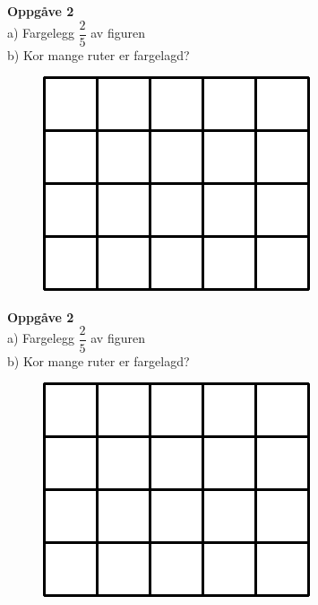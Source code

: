 \textbf{Oppgåve 2} \\
a) Fargelegg $ \dfrac{2}{5} $ av figuren\\
b) Kor mange ruter er fargelagd?
\begin{figure}
	\includegraphics{farg2_5}
\end{figure}\vspace{10pt}

\textbf{Oppgåve 2} \\
a) Fargelegg $ \dfrac{2}{5} $ av figuren\\
b) Kor mange ruter er fargelagd?
\begin{figure}
	\includegraphics{farg2_5}
\end{figure}
